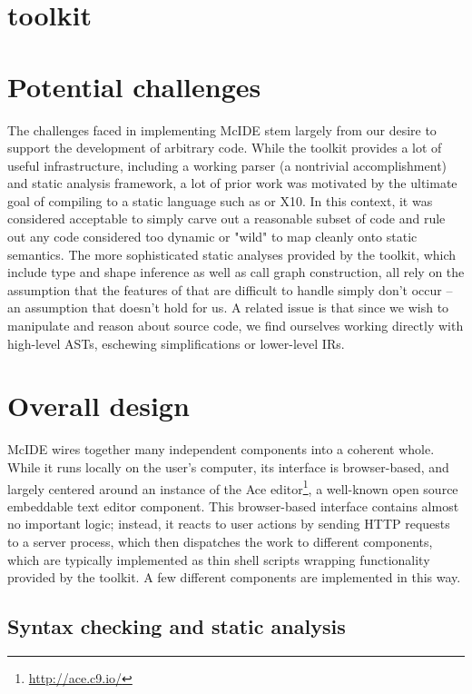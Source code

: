 \section{\mclab toolkit}

\section{Potential challenges}

The challenges faced in implementing McIDE stem largely from our desire to
support the development of arbitrary \matlab code. While the \mclab toolkit
provides a lot of useful infrastructure, including a working \matlab parser (a
nontrivial accomplishment) and static analysis framework, a lot of prior work
was motivated by the ultimate goal of compiling \matlab to a static language
such as \fortran or X10. In this context, it was considered acceptable to
simply carve out a reasonable subset of \matlab code and rule out any code
considered too dynamic or "wild" to map cleanly onto static semantics. The more
sophisticated static analyses provided by the \mclab toolkit, which include
type and shape inference as well as call graph construction, all rely on the
assumption that the features of \matlab that are difficult to handle simply
don't occur -- an assumption that doesn't hold for us. A related issue is that
since we wish to manipulate and reason about \matlab source code, we find
ourselves working directly with high-level ASTs, eschewing simplifications or
lower-level IRs.

\section{Overall design}

McIDE wires together many independent components into a coherent whole. While
it runs locally on the user's computer, its interface is browser-based, and
largely centered around an instance of the Ace
editor\footnote{\url{http://ace.c9.io/}}, a well-known open source embeddable
text editor component. This browser-based interface contains almost no
important logic; instead, it reacts to user actions by sending HTTP requests to
a server process, which then dispatches the work to different components, which
are typically implemented as thin shell scripts wrapping functionality provided
by the \mclab toolkit. A few different components are implemented in this way.

\subsection{Syntax checking and static analysis}

